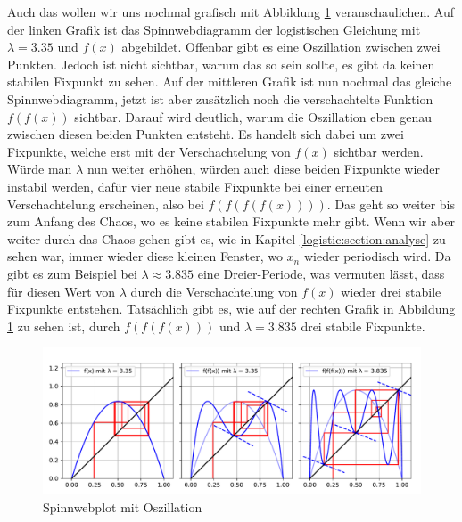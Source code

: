 Auch das wollen wir uns nochmal grafisch mit
Abbildung \ref{fig:web_2} veranschaulichen.  
Auf der linken Grafik ist das Spinnwebdiagramm der 
logistischen Gleichung mit $\lambda = 3.35$ und
$f(x)$ abgebildet. 
Offenbar gibt es eine Oszillation zwischen zwei Punkten.
Jedoch ist nicht sichtbar, warum das so sein sollte,
es gibt da keinen stabilen Fixpunkt zu sehen.
Auf der mittleren Grafik ist nun nochmal das gleiche
Spinnwebdiagramm, jetzt ist aber zusätzlich noch
die verschachtelte Funktion $f(f(x))$ sichtbar.
Darauf wird deutlich, warum die Oszillation eben genau 
zwischen diesen beiden Punkten entsteht. 
Es handelt sich dabei um zwei Fixpunkte, welche erst 
mit der Verschachtelung von $f(x)$ sichtbar werden.
Würde man $\lambda$ nun weiter erhöhen, würden auch
diese beiden Fixpunkte wieder instabil werden,
dafür vier neue stabile Fixpunkte bei einer erneuten
Verschachtelung erscheinen, 
also bei $f(f(f(f(x))))$. 
Das geht so weiter bis zum Anfang des Chaos, wo
es keine stabilen Fixpunkte mehr gibt. 
Wenn wir aber weiter durch das Chaos gehen gibt es, 
wie in Kapitel \ref{logistic:section:analyse}
zu sehen war, immer wieder diese kleinen Fenster,
wo $x_n$ wieder periodisch wird. 
Da gibt es zum Beispiel bei
$\lambda \approx 3.835$ eine Dreier-Periode,
was vermuten lässt, dass für diesen Wert
von $\lambda$ durch die Verschachtelung
von $f(x)$ wieder drei stabile Fixpunkte entstehen.
Tatsächlich gibt es, wie auf der rechten Grafik 
in Abbildung \ref{fig:web_2} zu sehen ist,
durch $f(f(f(x)))$ und $\lambda = 3.835$ drei stabile Fixpunkte. 

\begin{figure}
    \includegraphics[width=\linewidth]{papers/logistic/figures/web_2.pdf}
    \caption{Spinnwebplot mit Oszillation}
    \label{fig:web_2}
\end{figure}

